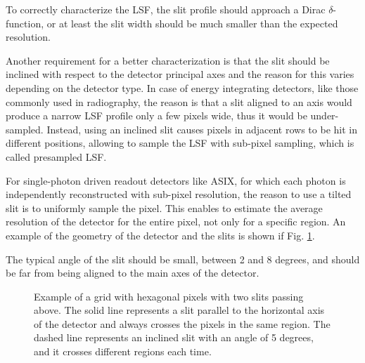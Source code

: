 To correctly characterize the LSF, the slit profile should approach a Dirac $\delta$-function, or at least the slit width should be much smaller than the expected resolution.

Another requirement for a better characterization is that the slit should be inclined with respect to the detector principal axes and the reason for this varies depending on the detector type. In case of energy integrating detectors, like those commonly used in radiography, the reason is that a slit aligned to an axis would produce a narrow LSF profile only a few pixels wide, thus it would be under-sampled. Instead, using an inclined slit causes pixels in adjacent rows to be hit in different positions, allowing to sample the LSF with sub-pixel sampling, which is called presampled LSF.

For single-photon driven readout detectors like ASIX, for which each photon is independently reconstructed with sub-pixel resolution, the reason to use a tilted slit is to uniformly sample the pixel. This enables to estimate the average resolution of the detector for the entire pixel, not only for a specific region. An example of the geometry of the detector and the slits is shown if Fig. \ref{fig:hex_grid_slits}.

The typical angle of the slit should be small, between 2 and 8 degrees, and should be far from being aligned to the main axes of the detector.

\begin{figure}[htbp]
    \centering
    \caption{Example of a grid with hexagonal pixels with two slits passing above. The solid line represents a slit parallel to the horizontal axis of the detector and always crosses the pixels in the same region. The dashed line represents an inclined slit with an angle of 5 degrees, and it crosses different regions each time.}
    \label{fig:hex_grid_slits}
\end{figure}

